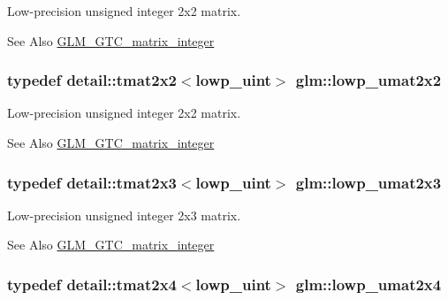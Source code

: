 Low-\/precision unsigned integer 2x2 matrix. 

\begin{DoxySeeAlso}{See Also}
\hyperlink{group__gtc__matrix__integer}{G\-L\-M\-\_\-\-G\-T\-C\-\_\-matrix\-\_\-integer} 
\end{DoxySeeAlso}
\hypertarget{group__gtc__matrix__integer_ga2159eb0e37b35ff0ea9a2c909bafaa72}{
\subsubsection[{lowp\-\_\-umat2x2}]{\setlength{\rightskip}{0pt plus 5cm}typedef detail\-::tmat2x2$<$lowp\-\_\-uint$>$ {\bf glm\-::lowp\-\_\-umat2x2}}}\label{group__gtc__matrix__integer_ga2159eb0e37b35ff0ea9a2c909bafaa72}


Low-\/precision unsigned integer 2x2 matrix. 

\begin{DoxySeeAlso}{See Also}
\hyperlink{group__gtc__matrix__integer}{G\-L\-M\-\_\-\-G\-T\-C\-\_\-matrix\-\_\-integer} 
\end{DoxySeeAlso}
\hypertarget{group__gtc__matrix__integer_gacce75aac1f0f0ae3cc18f4cde5db8def}{
\subsubsection[{lowp\-\_\-umat2x3}]{\setlength{\rightskip}{0pt plus 5cm}typedef detail\-::tmat2x3$<$lowp\-\_\-uint$>$ {\bf glm\-::lowp\-\_\-umat2x3}}}\label{group__gtc__matrix__integer_gacce75aac1f0f0ae3cc18f4cde5db8def}


Low-\/precision unsigned integer 2x3 matrix. 

\begin{DoxySeeAlso}{See Also}
\hyperlink{group__gtc__matrix__integer}{G\-L\-M\-\_\-\-G\-T\-C\-\_\-matrix\-\_\-integer} 
\end{DoxySeeAlso}
\hypertarget{group__gtc__matrix__integer_gaf468ff72b7f833789887c61b8db33869}{
\subsubsection[{lowp\-\_\-umat2x4}]{\setlength{\rightskip}{0pt plus 5cm}typedef detail\-::tmat2x4$<$lowp\-\_\-uint$>$ {\bf glm\-::lowp\-\_\-umat2x4}}}\label{group__gtc__matrix__integer_gaf468ff72b7f833789887c61b8db33869}


